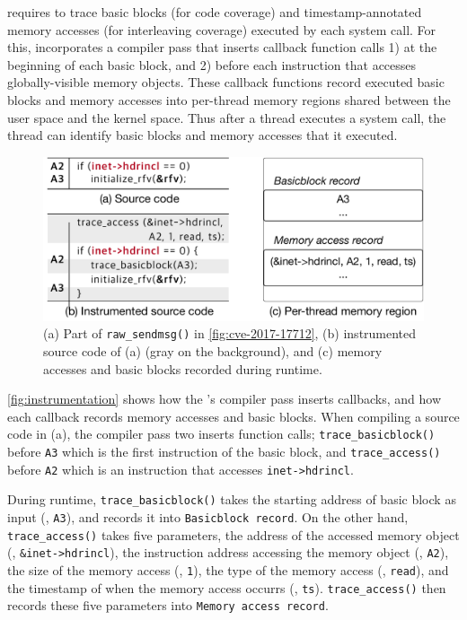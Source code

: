 \sys requires to trace basic blocks (for code coverage) and
timestamp-annotated memory accesses (for interleaving coverage)
executed by each system call.
%
For this, \sys incorporates a compiler pass that inserts callback
function calls 1) at the beginning of each basic block, and 2) before
each instruction that accesses globally-visible memory objects.
%
These callback functions record executed basic blocks and memory
accesses into per-thread memory regions shared between the user space
and the kernel space. Thus after a thread executes a system call, the
thread can identify basic blocks and memory accesses that it executed.



\begin{figure}
  \centering
  \includegraphics[width=0.9\linewidth]{fig/instrumentation.pdf}
  \caption{(a) Part of \texttt{raw_sendmsg()} in
    \autoref{fig:cve-2017-17712}, (b) instrumented source code of (a)
    (gray on the background), and (c) memory accesses and basic blocks
    recorded during runtime.}
  \label{fig:instrumentation}
\end{figure}

\autoref{fig:instrumentation} shows how the \sys's compiler pass
inserts callbacks, and how each callback records memory accesses and
basic blocks.
%
When compiling a source code in (a), the compiler pass two inserts
function calls; \texttt{trace_basicblock()} before \texttt{A3} which
is the first instruction of the basic block, and
\texttt{trace_access()} before \texttt{A2} which is an instruction
that accesses \texttt{inet->hdrincl}.


During runtime, \texttt{trace_basicblock()} takes the starting address
of basic block as input (\ie, \texttt{A3}), and records it into
\texttt{Basicblock record}.
%
On the other hand, \texttt{trace_access()} takes five parameters, the
address of the accessed memory object (\ie, \texttt{\&inet->hdrincl}),
the instruction address accessing the memory object (\ie,
\texttt{A2}), the size of the memory access (\ie, \texttt{1}), the
type of the memory access (\ie, \texttt{read}), and the timestamp of
when the memory access occurrs (\ie, \texttt{ts}).
%
\texttt{trace_access()} then records these five parameters into
\texttt{Memory access record}.






